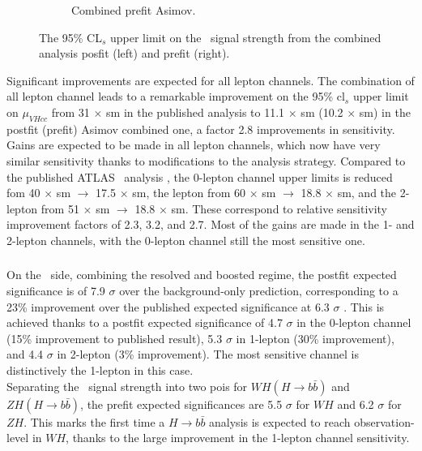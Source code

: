 \begin{figure}[h!]
\begin{subfigure}[b]{0.48\textwidth}
      \caption{Combined prefit Asimov.}
      \label{fig:fit_new_vhcclimitPrefit}
  \end{subfigure}
    \caption{The 95\% CL$_s$ upper limit on the \vhc\ signal strength from the combined analysis posfit (left) and prefit (right).}
    \label{fig:fit_vhcc_limits}
\end{figure} 

Significant improvements are expected for all lepton channels. The combination of all lepton channel leads to a remarkable improvement on the 95\% \gls{cl}$_s$ upper limit on $\mu_{VHcc}$ from 31 $\times$ \gls{sm} in the published analysis to 11.1 $\times$ \gls{sm} (10.2 $\times$ \gls{sm}) in the postfit (prefit) Asimov combined one, a factor 2.8 improvements in sensitivity. Gains are expected to be made in all lepton channels, which now have very similar sensitivity thanks to modifications to the analysis strategy. Compared to the published ATLAS \vhc\ analysis \cite{Collaboration:2721696}, the 0-lepton channel upper limits is reduced fom 40 $\times$ \gls{sm} $\rightarrow$ 17.5 $\times$ \gls{sm}, the lepton from 60 $\times$ \gls{sm} $\rightarrow$ 18.8 $\times$ \gls{sm}, and the 2-lepton from 51 $\times$ \gls{sm} $\rightarrow$ 18.8 $\times$ \gls{sm}. These correspond to relative sensitivity improvement factors of 2.3, 3.2, and 2.7. Most of the gains are made in the 1- and 2-lepton channels, with the 0-lepton channel still the most sensitive one.

\subsubsection{\boldvhb}
On the \vhb\ side, combining the resolved and boosted regime, the postfit expected significance is of 7.9 $\sigma$ over the background-only prediction, corresponding to a 23\% improvement over the published expected significance at 6.3 $\sigma$ \cite{ATLAS:2021wqh}. This is achieved thanks to a postfit expected significance of 4.7 $\sigma$ in the 0-lepton channel (15\% improvement to published result), 5.3 $\sigma$ in 1-lepton (30\% improvement), and 4.4 $\sigma$ in 2-lepton (3\% improvement). The most sensitive channel is distinctively the 1-lepton in this case. \\%

Separating the \vhb\ signal strength into two \gls{poi}s for $WH(H \rightarrow{b\bar{b}})$ and $ZH(H \rightarrow{b\bar{b}})$, the prefit expected significances are 5.5 $\sigma$ for $WH$ and 6.2 $\sigma$ for $ZH$. This marks the first time a $H \rightarrow b\bar{b}$ analysis is expected to reach observation-level in $WH$, thanks to the large improvement in the 1-lepton channel sensitivity. \\

